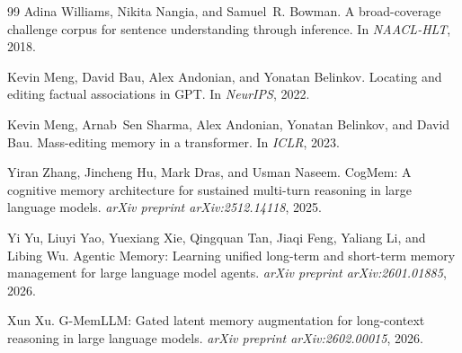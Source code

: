 \documentclass[11pt,a4paper]{article}
\begin{document}
\begin{thebibliography}{99}
Adina Williams, Nikita Nangia, and Samuel~R. Bowman.
\newblock A broad-coverage challenge corpus for sentence understanding through inference.
\newblock In \emph{NAACL-HLT}, 2018.

Kevin Meng, David Bau, Alex Andonian, and Yonatan Belinkov.
\newblock Locating and editing factual associations in GPT.
\newblock In \emph{NeurIPS}, 2022.

Kevin Meng, Arnab~Sen Sharma, Alex Andonian, Yonatan Belinkov, and David Bau.
\newblock Mass-editing memory in a transformer.
\newblock In \emph{ICLR}, 2023.

Yiran Zhang, Jincheng Hu, Mark Dras, and Usman Naseem.
\newblock CogMem: A cognitive memory architecture for sustained multi-turn reasoning in large language models.
\newblock \emph{arXiv preprint arXiv:2512.14118}, 2025.

Yi Yu, Liuyi Yao, Yuexiang Xie, Qingquan Tan, Jiaqi Feng, Yaliang Li, and Libing Wu.
\newblock Agentic Memory: Learning unified long-term and short-term memory management for large language model agents.
\newblock \emph{arXiv preprint arXiv:2601.01885}, 2026.

Xun Xu.
\newblock G-MemLLM: Gated latent memory augmentation for long-context reasoning in large language models.
\newblock \emph{arXiv preprint arXiv:2602.00015}, 2026.

\end{thebibliography}
\end{document}
